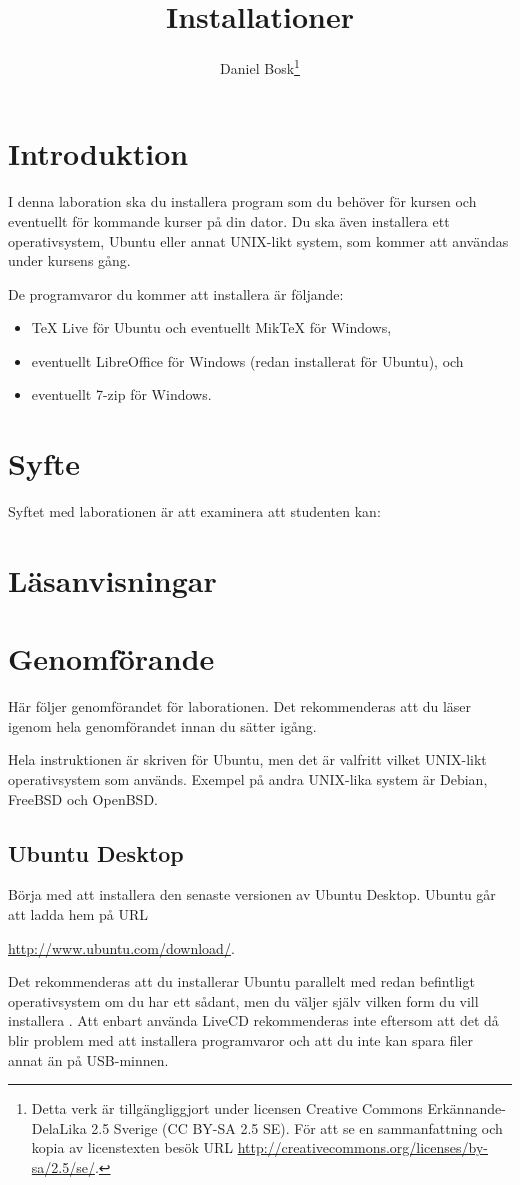 \documentclass[a4paper,nocourse]{miunasgn}
\title{Installationer}
\author{Daniel Bosk\footnote{%
	Detta verk är tillgängliggjort under licensen Creative Commons 
	Erkännande-DelaLika 2.5 Sverige (CC BY-SA 2.5 SE).
	För att se en sammanfattning och kopia av licenstexten besök URL 
	\url{http://creativecommons.org/licenses/by-sa/2.5/se/}.
}}
\date{\svnId}
\begin{document}
\maketitle
\thispagestyle{foot}
\tableofcontents


\section{Introduktion}
\label{sec:Introduktion}
I denna laboration ska du installera program som du behöver för kursen och 
eventuellt för kommande kurser på din dator.
Du ska även installera ett operativsystem, Ubuntu eller annat UNIX-likt system, 
som kommer att användas under kursens gång.

De programvaror du kommer att installera är följande:
\begin{itemize}
	\item TeX Live för Ubuntu och eventuellt MikTeX för Windows,
	\item eventuellt LibreOffice för Windows (redan installerat för Ubuntu), och
  \item eventuellt 7-zip för Windows.
\end{itemize}


\section{Syfte}
\label{sec:Syfte}
Syftet med laborationen är att examinera att studenten kan:
\begin{itemize}
  
\end{itemize}


\section{Läsanvisningar}
\label{sec:Lasanvisningar}



\section{Genomförande}
\label{sec:Genomforande}
Här följer genomförandet för laborationen.
Det rekommenderas att du läser igenom hela genomförandet innan du sätter igång.

Hela instruktionen är skriven för Ubuntu, men det är valfritt vilket UNIX-likt 
operativsystem som används.
Exempel på andra UNIX-lika system är Debian, FreeBSD och OpenBSD.

\subsection{Ubuntu Desktop}
\noindent
Börja med att installera den senaste versionen av Ubuntu Desktop.
Ubuntu går att ladda hem på URL
\begin{center}
	\url{http://www.ubuntu.com/download/}.
\end{center}
Det rekommenderas att du installerar Ubuntu parallelt med redan befintligt 
operativsystem om du har ett sådant, men du väljer själv vilken form du vill 
installera \citep[för detaljer, se][]{UbuntuInstall}.
Att enbart använda LiveCD rekommenderas inte eftersom att det då blir problem 
med att installera programvaror och att du inte kan spara filer annat än på 
USB-minnen.
\end{document}
